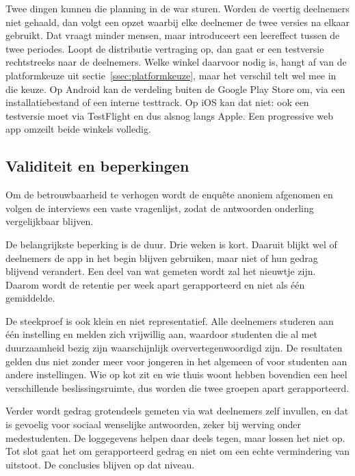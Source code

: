 \documentclass{hogent-article}
\begin{document}
    Twee dingen kunnen die planning in de war sturen. Worden de veertig deelnemers
    niet gehaald, dan volgt een opzet waarbij elke deelnemer de twee versies na
    elkaar gebruikt. Dat vraagt minder mensen, maar introduceert een leereffect
    tussen de twee periodes. Loopt de distributie vertraging op, dan gaat er een
    testversie rechtstreeks naar de deelnemers. Welke winkel daarvoor nodig is,
    hangt af van de platformkeuze uit sectie~\ref{ssec:platformkeuze}, maar het
    verschil telt wel mee in die keuze. Op Android kan de verdeling buiten de Google
    Play Store om, via een installatiebestand of een interne testtrack. Op iOS kan
    dat niet: ook een testversie moet via TestFlight en dus alsnog langs Apple. Een
    progressive web app omzeilt beide winkels volledig.
    
    \subsection{Validiteit en beperkingen}%
    \label{ssec:beperkingen}
    
    Om de betrouwbaarheid te verhogen wordt de enquête anoniem afgenomen en volgen
    de interviews een vaste vragenlijst, zodat de antwoorden onderling vergelijkbaar
    blijven.
    
    De belangrijkste beperking is de duur. Drie weken is kort. Daaruit blijkt wel of
    deelnemers de app in het begin blijven gebruiken, maar niet of hun gedrag
    blijvend verandert. Een deel van wat gemeten wordt zal het nieuwtje zijn. Daarom
    wordt de retentie per week apart gerapporteerd en niet als één gemiddelde.
    
    De steekproef is ook klein en niet representatief. Alle deelnemers studeren aan
    één instelling en melden zich vrijwillig aan, waardoor studenten die al met
    duurzaamheid bezig zijn waarschijnlijk oververtegenwoordigd zijn. De resultaten
    gelden dus niet zonder meer voor jongeren in het algemeen of voor studenten aan
    andere instellingen. Wie op kot zit en wie thuis woont hebben bovendien een heel
    verschillende beslissingsruimte, dus worden die twee groepen apart gerapporteerd.
    
    Verder wordt gedrag grotendeels gemeten via wat deelnemers zelf invullen, en dat
    is gevoelig voor sociaal wenselijke antwoorden, zeker bij werving onder
    medestudenten. De loggegevens helpen daar deels tegen, maar lossen het niet op.
    Tot slot gaat het om gerapporteerd gedrag en niet om een echte vermindering van
    uitstoot. De conclusies blijven op dat niveau.
    
\end{document}

